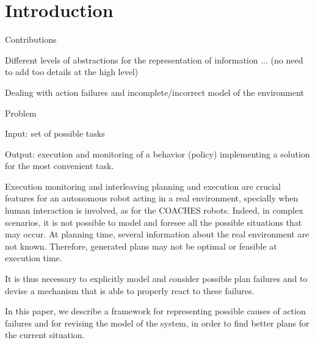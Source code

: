 \section{Introduction}

Contributions

Different levels of abstractions for the representation of information ...
(no need to add too details at the high level)


Dealing with action failures and incomplete/incorrect model of the environment


Problem

Input: set of possible tasks

Output: execution and monitoring of a behavior (policy) implementing a solution for the most convenient task.




Execution monitoring and interleaving planning and execution are crucial features for an autonomous robot acting in a real environment, specially when human interaction is involved, 
as for the COACHES robots. Indeed, in complex scenarios, it is not possible to model and foresee all the possible situations that may occur.
At planning time, several information about the real environment are not known. Therefore, generated plans may not be optimal or feasible at execution time.

It is thus necessary to explicitly model and consider possible plan failures and to devise a mechanism that is able to properly react to these failures.

In this paper, we describe a framework for representing possible causes of action failures and for revising the model of the system, in order to find better plans for the current situation.
